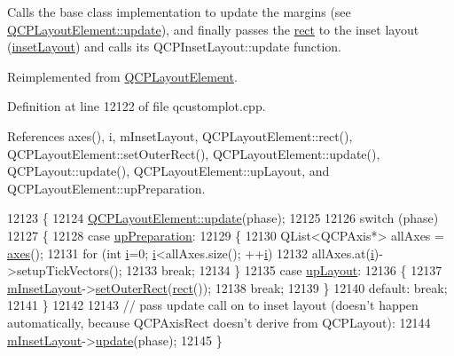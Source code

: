 Calls the base class implementation to update the margins (see \hyperlink{class_q_c_p_layout_element_a929c2ec62e0e0e1d8418eaa802e2af9b}{Q\+C\+P\+Layout\+Element\+::update}), and finally passes the \hyperlink{class_q_c_p_layout_element_affdfea003469aac3d0fac5f4e06171bc}{rect} to the inset layout (\hyperlink{class_q_c_p_axis_rect_a4114887c7141b59650b7488f930993e5}{inset\+Layout}) and calls its Q\+C\+P\+Inset\+Layout\+::update function. 

Reimplemented from \hyperlink{class_q_c_p_layout_element_a929c2ec62e0e0e1d8418eaa802e2af9b}{Q\+C\+P\+Layout\+Element}.



Definition at line 12122 of file qcustomplot.\+cpp.



References axes(), i, m\+Inset\+Layout, Q\+C\+P\+Layout\+Element\+::rect(), Q\+C\+P\+Layout\+Element\+::set\+Outer\+Rect(), Q\+C\+P\+Layout\+Element\+::update(), Q\+C\+P\+Layout\+::update(), Q\+C\+P\+Layout\+Element\+::up\+Layout, and Q\+C\+P\+Layout\+Element\+::up\+Preparation.


\begin{DoxyCode}
12123 \{
12124   \hyperlink{class_q_c_p_layout_element_a929c2ec62e0e0e1d8418eaa802e2af9b}{QCPLayoutElement::update}(phase);
12125   
12126   \textcolor{keywordflow}{switch} (phase)
12127   \{
12128     \textcolor{keywordflow}{case} \hyperlink{class_q_c_p_layout_element_a0d83360e05735735aaf6d7983c56374dad6119882eba136357c2f627992e527d3}{upPreparation}:
12129     \{
12130       QList<QCPAxis*> allAxes = \hyperlink{class_q_c_p_axis_rect_a18dcdc0dd6c7520bc9f3d15a7a3feec2}{axes}();
12131       \textcolor{keywordflow}{for} (\textcolor{keywordtype}{int} \hyperlink{_comparision_pictures_2_createtest_image_8m_a6f6ccfcf58b31cb6412107d9d5281426}{i}=0; \hyperlink{_comparision_pictures_2_createtest_image_8m_a6f6ccfcf58b31cb6412107d9d5281426}{i}<allAxes.size(); ++\hyperlink{_comparision_pictures_2_createtest_image_8m_a6f6ccfcf58b31cb6412107d9d5281426}{i})
12132         allAxes.at(\hyperlink{_comparision_pictures_2_createtest_image_8m_a6f6ccfcf58b31cb6412107d9d5281426}{i})->setupTickVectors();
12133       \textcolor{keywordflow}{break};
12134     \}
12135     \textcolor{keywordflow}{case} \hyperlink{class_q_c_p_layout_element_a0d83360e05735735aaf6d7983c56374da5d1ccf5d79967c232c3c511796860045}{upLayout}:
12136     \{
12137       \hyperlink{class_q_c_p_axis_rect_a255240399e0fd24baad80cbbe46f698a}{mInsetLayout}->\hyperlink{class_q_c_p_layout_element_a38975ea13e36de8e53391ce41d94bc0f}{setOuterRect}(\hyperlink{class_q_c_p_layout_element_affdfea003469aac3d0fac5f4e06171bc}{rect}());
12138       \textcolor{keywordflow}{break};
12139     \}
12140     \textcolor{keywordflow}{default}: \textcolor{keywordflow}{break};
12141   \}
12142   
12143   \textcolor{comment}{// pass update call on to inset layout (doesn't happen automatically, because QCPAxisRect doesn't derive
       from QCPLayout):}
12144   \hyperlink{class_q_c_p_axis_rect_a255240399e0fd24baad80cbbe46f698a}{mInsetLayout}->\hyperlink{class_q_c_p_layout_a34ab477e820537ded7bade4399c482fd}{update}(phase);
12145 \}
\end{DoxyCode}


